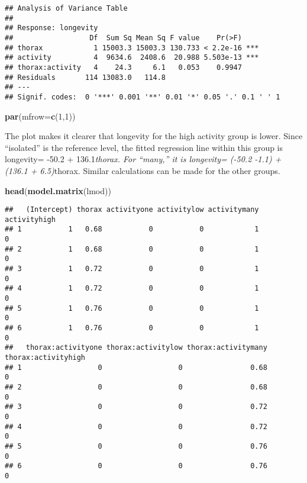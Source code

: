 \documentclass[
]{article}
\newenvironment{Shaded}{\begin{snugshade}}{\end{snugshade}}
\newcommand{\DataTypeTok}[1]{\textcolor[rgb]{0.13,0.29,0.53}{#1}}
\newcommand{\DecValTok}[1]{\textcolor[rgb]{0.00,0.00,0.81}{#1}}
\newcommand{\KeywordTok}[1]{\textcolor[rgb]{0.13,0.29,0.53}{\textbf{#1}}}
\newcommand{\NormalTok}[1]{#1}
\begin{document}
\begin{verbatim}
## Analysis of Variance Table
## 
## Response: longevity
##                  Df  Sum Sq Mean Sq F value    Pr(>F)    
## thorax            1 15003.3 15003.3 130.733 < 2.2e-16 ***
## activity          4  9634.6  2408.6  20.988 5.503e-13 ***
## thorax:activity   4    24.3     6.1   0.053    0.9947    
## Residuals       114 13083.0   114.8                      
## ---
## Signif. codes:  0 '***' 0.001 '**' 0.01 '*' 0.05 '.' 0.1 ' ' 1
\end{verbatim}

\begin{Shaded}
\begin{Highlighting}[]
\KeywordTok{par}\NormalTok{(}\DataTypeTok{mfrow=}\KeywordTok{c}\NormalTok{(}\DecValTok{1}\NormalTok{,}\DecValTok{1}\NormalTok{))}
\end{Highlighting}
\end{Shaded}

The plot makes it clearer that longevity for the high activity group is
lower. Since ``isolated'' is the reference level, the fitted regression
line within this group is longevity= -50.2 + 136.1\emph{thorax. For
``many,'' it is longevity= (-50.2 -1.1) + (136.1 + 6.5)}thorax. Similar
calculations can be made for the other groups.

\begin{Shaded}
\begin{Highlighting}[]
\KeywordTok{head}\NormalTok{(}\KeywordTok{model.matrix}\NormalTok{(lmod))}
\end{Highlighting}
\end{Shaded}

\begin{verbatim}
##   (Intercept) thorax activityone activitylow activitymany activityhigh
## 1           1   0.68           0           0            1            0
## 2           1   0.68           0           0            1            0
## 3           1   0.72           0           0            1            0
## 4           1   0.72           0           0            1            0
## 5           1   0.76           0           0            1            0
## 6           1   0.76           0           0            1            0
##   thorax:activityone thorax:activitylow thorax:activitymany thorax:activityhigh
## 1                  0                  0                0.68                   0
## 2                  0                  0                0.68                   0
## 3                  0                  0                0.72                   0
## 4                  0                  0                0.72                   0
## 5                  0                  0                0.76                   0
## 6                  0                  0                0.76                   0
\end{verbatim}
\end{document}
